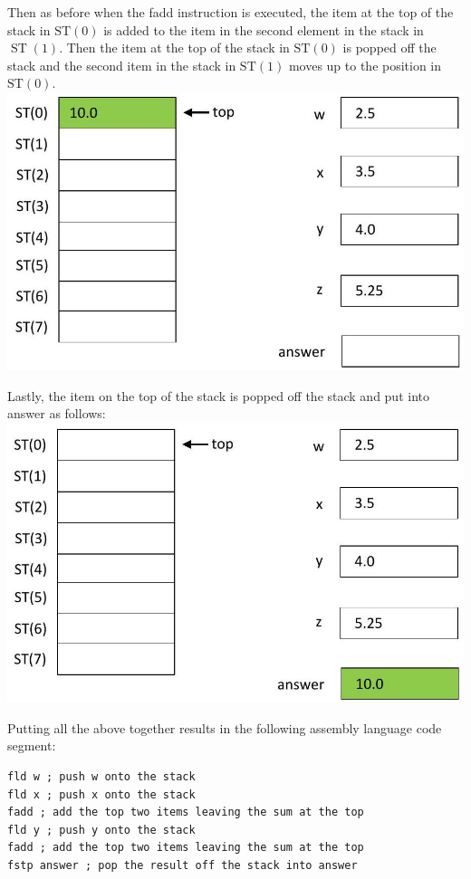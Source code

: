 \documentclass[10pt]{article}
\begin{document}
Then as before when the fadd instruction is executed, the item at the top of the stack in $\mathrm{ST}(0)$ is added to the item in the second element in the stack in $\operatorname{ST}(1)$. Then the item at the top of the stack in $\mathrm{ST}(0)$ is popped off the stack and the second item in the stack in $\mathrm{ST}(1)$ moves up to the position in $\mathrm{ST}(0)$.\\
\includegraphics[max width=\textwidth, center]{2025_03_24_ebe50cc223a6fbc49eecg-228}

Lastly, the item on the top of the stack is popped off the stack and put into answer as follows:\\
\includegraphics[max width=\textwidth, center]{2025_03_24_ebe50cc223a6fbc49eecg-229}

Putting all the above together results in the following assembly language code segment:

\begin{verbatim}
fld w ; push w onto the stack
fld x ; push x onto the stack
fadd ; add the top two items leaving the sum at the top
fld y ; push y onto the stack
fadd ; add the top two items leaving the sum at the top
fstp answer ; pop the result off the stack into answer
\end{verbatim}
\end{document}
